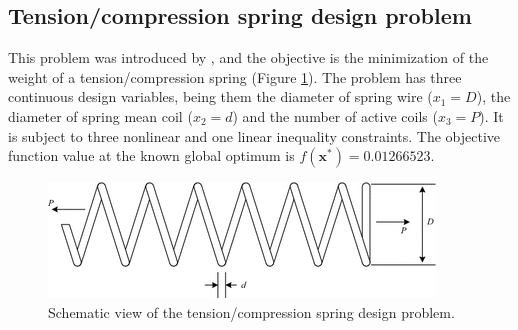 
\subsection*{Tension/compression spring design problem}


This problem was introduced by \cite{TC}, and the objective is the minimization of the weight of a tension/compression spring (Figure \ref{fig:TC}). The problem has three continuous design variables, being them the diameter of spring wire ($x_1 = D$), the diameter of spring mean coil ($x_2 = d$) and the number of active coils ($x_3 = P$). It is subject to three nonlinear and one linear inequality constraints. The objective function value at the known global optimum is $f(\bm{x}^*) = 0.01266523$.

\begin{figure}[h]
\begin{center}
\includegraphics[scale=0.6]{Imgs/TC.png}
\end{center}
\captionsetup{justification=centering}
\caption{Schematic view of the tension/compression spring design problem.}\label{fig:TC}
\end{figure}


